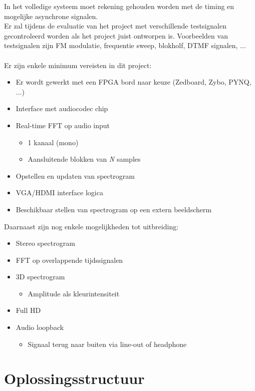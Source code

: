 \documentclass[a4paper,kul]{kulakarticle} %
\begin{document}
In het volledige systeem moet rekening gehouden worden met de timing en mogelijke asynchrone signalen. \\
Er zal tijdens de evaluatie van het project met verschillende testsignalen gecontroleerd worden als het project juist ontworpen is. Voorbeelden van testsignalen zijn FM modulatie, frequentie sweep, blokholf, DTMF signalen, ... \\
\\ Er zijn enkele minimum vereisten in dit project:
\begin{itemize}
	\item Er wordt gewerkt met een FPGA bord naar keuze (Zedboard, Zybo, PYNQ, ...)
	\item Interface met audiocodec chip
	\item Real-time FFT op audio input
	\begin{itemize}
		\item 1 kanaal (mono)
		\item Aansluitende blokken van \textit{N} samples
	\end{itemize}
	\item Opstellen en updaten van spectrogram
	\item VGA/HDMI interface logica
	\item Beschikbaar stellen van spectrogram op een extern beeldscherm
\end{itemize}
Daarnaast zijn nog enkele mogelijkheden tot uitbreiding:
\begin{itemize}
	\item Stereo spectrogram
	\item FFT op overlappende tijdssignalen
	\item 3D spectrogram
	\begin{itemize}
		\item Amplitude als kleurintensiteit
	\end{itemize}
	\item Full HD
	\item Audio loopback
	\begin{itemize}
		\item Signaal terug naar buiten via line-out of headphone
	\end{itemize}
\end{itemize}

\section{Oplossingsstructuur}
\end{document}
